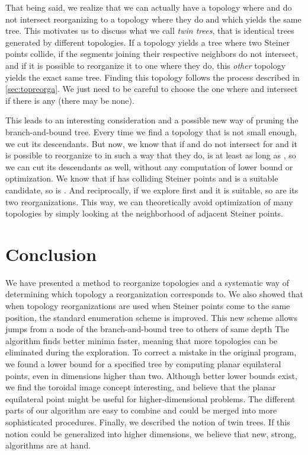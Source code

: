 \documentclass{article}
\theoremstyle{plain}
\begin{document}
That being said, we realize that we can actually have a topology where  and  do not intersect reorganizing to a topology where they do and which yields the same tree. 
This motivates us to discuss what we call \emph{twin trees}, that is identical trees generated by different topologies. 
If a topology  yields a tree where two Steiner points collide, if the segments joining their respective neighbors do not intersect, and if it is possible to reorganize it to one where they do, this \emph{other} topology yields the exact same tree. 
Finding this topology follows the process described in \cref{sec:topreorga}. 
We just need to be careful to choose the one where  and  intersect if there is any (there may be none).

This leads to an interesting consideration and a possible new way of pruning the \mbox{branch-and-bound} tree. 
Every time we find a topology  that is not small enough, we cut its descendants. 
But now, we know that if  and  do not intersect for  and it is possible to reorganize  to  in such a way that they do,  is at least as long as , so we can cut its descendants as well, without any computation of lower bound or optimization. 
We know that if  has colliding Steiner points and is a suitable candidate, so is .
And reciprocally, if we explore  first and it is suitable, so are its two reorganizations.
This way, we can theoretically avoid optimization of many topologies by simply looking at the neighborhood of adjacent Steiner points.


\FloatBarrier







\section{Conclusion}
\label{sec:conclusion}
 
We have presented a method to reorganize topologies and a systematic way of determining which topology a reorganization corresponds to.
We also showed that when topology reorganizations are used when Steiner points come to the same position, the standard enumeration scheme is improved.
This new scheme allows jumps from a node of the \mbox{branch-and-bound} tree to others of same depth
The algorithm finds better minima faster, meaning that more topologies can be eliminated during the exploration. 
To correct a mistake in the original program, we found a lower bound for a specified tree by computing planar equilateral points, even in dimensions higher than two. 
Although better lower bounds exist, we find the toroidal image concept interesting, and believe that the planar equilateral point might be useful for higher-dimensional problems. 
The different parts of our algorithm are easy to combine and could be merged into more sophisticated procedures.
Finally, we described the notion of twin trees. If this notion could be generalized into higher dimensions, we believe that new, strong, algorithms are at hand.
\end{document}
